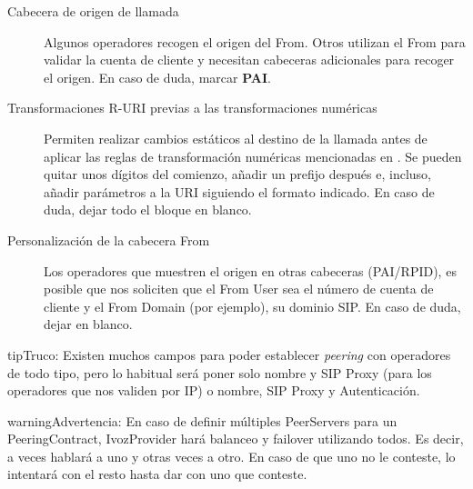 \documentclass[letterpaper,10pt,spanish]{sphinxmanual}
\begin{document}
\begin{description}
\item[{Cabecera de origen de llamada}] \leavevmode{}\label{external_incoming_calls/peering_contracts:term-call-origin-header}
Algunos operadores recogen el origen del From. Otros utilizan el From para validar la cuenta de cliente y necesitan cabeceras adicionales para recoger el origen. En caso de duda, marcar \textbf{PAI}.

\item[{Transformaciones R-URI previas a las transformaciones numéricas}] \leavevmode{}\label{external_incoming_calls/peering_contracts:term-r-uri-transformations-before-numeric-transformations}
Permiten realizar cambios estáticos al destino de la llamada antes de aplicar las reglas de transformación numéricas mencionadas en {\hyperref[external_incoming_calls/numeric_transformations:numeric\string-transformations]{}}. Se pueden quitar unos dígitos del comienzo, añadir un prefijo después e, incluso, añadir parámetros a la URI siguiendo el formato indicado. En caso de duda, dejar todo el bloque en blanco.

\item[{Personalización de la cabecera From}] \leavevmode{}\label{external_incoming_calls/peering_contracts:term-from-header-customization}
Los operadores que muestren el origen en otras cabeceras (PAI/RPID), es posible que nos soliciten que el From User sea el número de cuenta de cliente y el From Domain (por ejemplo), su dominio SIP. En caso de duda, dejar en blanco.

\end{description}

\begin{notice}{tip}{Truco:}
Existen muchos campos para poder establecer \emph{peering} con operadores de todo tipo, pero lo habitual será poner solo nombre y SIP Proxy (para los operadores que nos validen por IP) o nombre, SIP Proxy y Autenticación.
\end{notice}

\begin{notice}{warning}{Advertencia:}
En caso de definir múltiples PeerServers para un PeeringContract, IvozProvider hará balanceo y failover utilizando todos. Es decir, a veces hablará a uno y otras veces a otro. En caso de que uno no le conteste, lo intentará con el resto hasta dar con uno que conteste.
\end{notice}
\end{document}
